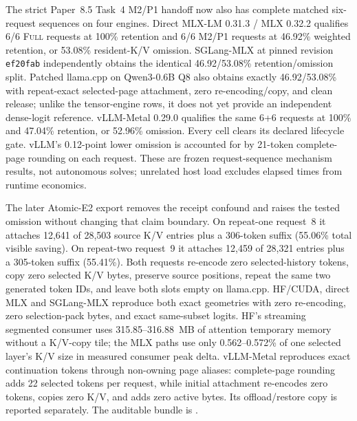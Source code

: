 \documentclass[11pt]{article}
\begin{document}
The strict Paper~8.5 Task~4 M2/P1 handoff now also has complete matched
six-request sequences on four engines.  Direct MLX-LM 0.31.3 / MLX 0.32.2
qualifies 6/6 \textsc{Full} requests at 100\% retention and 6/6 M2/P1 requests
at 46.92\% weighted retention, or 53.08\% resident-K/V omission.  SGLang-MLX
at pinned revision \texttt{ef20fab} independently obtains the identical
46.92/53.08\% retention/omission split.  Patched llama.cpp on Qwen3-0.6B Q8
also obtains exactly 46.92/53.08\% with repeat-exact selected-page attachment,
zero re-encoding/copy, and clean release; unlike the tensor-engine rows, it
does not yet provide an independent dense-logit reference.  vLLM-Metal 0.29.0
qualifies the same 6+6 requests at 100\% and 47.04\% retention, or 52.96\%
omission.  Every cell clears its declared lifecycle gate.  vLLM's
0.12-point lower omission is accounted for by 21-token complete-page rounding
on each request.  These are frozen request-sequence mechanism results, not
autonomous solves; unrelated host load excludes elapsed times from runtime
economics.

The later Atomic-E2 export removes the receipt confound and raises the tested
omission without changing that claim boundary.  On repeat-one
request~8 it attaches 12,641 of 28,503 source K/V entries plus a 306-token
suffix (55.06\% total visible saving).  On repeat-two request~9 it attaches
12,459 of 28,321 entries plus a 305-token suffix (55.41\%).  Both requests
re-encode zero selected-history tokens, copy zero selected K/V bytes, preserve
source positions, repeat the same two generated token IDs, and leave both
slots empty on llama.cpp.  HF/CUDA, direct MLX and SGLang-MLX reproduce both
exact geometries with zero re-encoding, zero selection-pack bytes, and exact
same-subset logits.  HF's streaming segmented consumer uses
315.85--316.88~MB of attention temporary memory without a K/V-copy tile; the
MLX paths use only 0.562--0.572\% of one selected layer's K/V size in measured
consumer peak delta.  vLLM-Metal reproduces exact continuation tokens through
non-owning page aliases: complete-page rounding adds 22 selected tokens per
request, while initial attachment re-encodes zero tokens, copies zero K/V, and
adds zero active bytes.  Its offload/restore copy is reported separately.  The auditable bundle is
.
\end{document}
